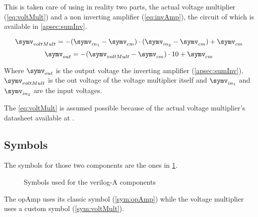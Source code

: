 This is taken care of using in reality two parts, the actual voltage multiplier (\cref{eq:voltMult}) and a non inverting amplifier (\cref{eq:invAmp}), the circuit of which is available in \cref{apsec:sumInv}.

\begin{equation}\label{eq:voltMult}
  \symv_{voltMult}=-(\symv_{in_1}-\symv_{cm})\cdot (\symv_{in_2}-\symv_{cm}) + \symv_{cm}
\end{equation}
\begin{equation}\label{eq:invAmp}
  \symv_{out}=-(\symv_{voltMult}-\symv_{cm})\cdot10+\symv_{cm}
\end{equation}

Where $\symv_{out}$ is the output voltage the inverting amplifier (\cref{apsec:sumInv}), $\symv_{voltMult}$ is the out voltage of the voltage multiplier itself and $\symv_{in_1}$ and $\symv_{in_2}$ are the input voltages.

The \cref{eq:voltMult} is assumed possible because of the actual voltage multiplier's datasheet available at \cite{actualVoltMult}.

\subsection{Symbols}

The symbols for those two components are the ones in \cref{sym:models}.

\begin{figure}[H]
  \centering
  \hspace*{2cm}
  \hfill
  \hspace*{2cm}
  \caption{Symbols used for the verilog-A components}
  \label{sym:models}
\end{figure}

The \ac{opAmp} uses its classic symbol (\cref{sym:opAmp}) while the voltage multiplier uses a custom symbol (\cref{sym:voltMult}).
